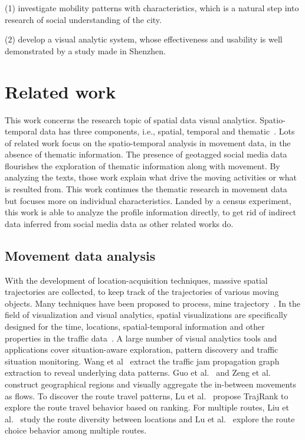 (1) investigate mobility patterns with characteristics, which is a natural step into research of social understanding of the city.

(2) develop a visual analytic system, whose effectiveness and usability is well demonstrated by a study made in Shenzhen.



\section{Related work}

This work concerns the research topic of spatial data visual analytics. Spatio-temporal data has three components, i.e., spatial, temporal and thematic~\citep{andrienko2013visual}. Lots of related work focus on the spatio-temporal analysis in movement data, in the absence of thematic information. The presence of geotagged social media data flourishes the exploration of thematic information along with movement. By analyzing the texts, those work explain what drive the moving activities or what is resulted from. This work continues the thematic research in movement data but focuses more on individual characteristics. Landed by a census experiment, this work is able to analyze the profile information directly, to get rid of indirect data inferred from social media data as other related works do.

\subsection{Movement data analysis}
 With the development of location-acquisition techniques, massive spatial trajectories are collected, to keep track of the trajectories of various moving objects. Many techniques have been proposed to process, mine trajectory~\citep{Zheng2015_trajectory}. In the field of visualization and visual analytics, spatial visualizations are specifically designed for the time, locations, spatial-temporal information and other properties in the traffic data~\citep{chen2015survey}. A large number of visual analytics tools and applications cover situation-aware exploration, pattern discovery and traffic situation monitoring. Wang et al~\citep{wang2013visual} extract the traffic jam propagation graph extraction to reveal underlying data patterns. Guo et al.~\citep{guo2011tripvista} and Zeng et al.~\citep{zeng2013visualizing} construct geographical regions and visually aggregate the in-between movements as flows. To discover the route travel patterns, Lu et al.~\citep{lu2015trajrank} propose TrajRank to explore the route travel behavior based on ranking. For multiple routes, Liu et al.~\citep{liu2011_routediversity} study the route diversity between locations and Lu et al.~\citep{Lu2017_multipleroute} explore the route choice behavior among multiple routes.

